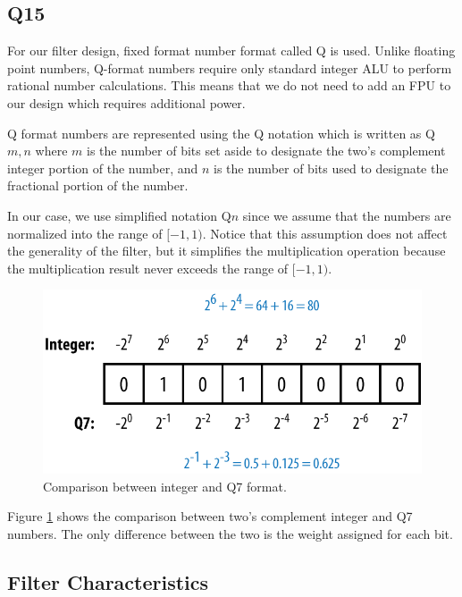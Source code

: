 \subsection{Q15} \label{sec:q15}

For our filter design, fixed format number format called Q is used. Unlike floating point numbers, Q-format numbers require only standard integer ALU to perform rational number calculations. This means that we do not need to add an FPU to our design which requires additional power.

Q format numbers are represented using the Q notation which is written as Q$m,n$ where $m$ is the number of bits set aside to designate the two's complement integer portion of the number, and $n$ is the number of bits used to designate the fractional portion of the number.

In our case, we use simplified notation Q$n$ since we assume that the numbers are normalized into the range of $[-1, 1)$. Notice that this assumption does not affect the generality of the filter, but it simplifies the multiplication operation because the multiplication result never exceeds the range of $[-1, 1)$.

\begin{figure}[ht]
	\centering
	\includegraphics[scale=1.5]{images/q7}
	\caption{Comparison between integer and Q7 format.}
	\label{fig:q7}
\end{figure}

Figure \ref{fig:q7} shows the comparison between two's complement integer and Q7 numbers. The only difference between the two is the weight assigned for each bit.

\subsection{Filter Characteristics}

